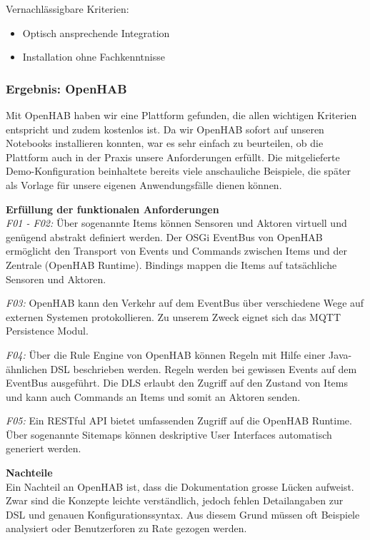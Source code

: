 Vernachlässigbare Kriterien:
\begin{itemize}
	\item Optisch ansprechende Integration
	\item Installation ohne Fachkenntnisse
\end{itemize}

\subsubsection{Ergebnis: OpenHAB} 
Mit OpenHAB haben wir eine Plattform gefunden, die allen wichtigen Kriterien entspricht und zudem kostenlos ist. Da wir OpenHAB sofort auf unseren Notebooks installieren konnten, war es sehr einfach zu beurteilen, ob die Plattform auch in der Praxis unsere Anforderungen erfüllt. Die mitgelieferte Demo-Konfiguration beinhaltete bereits viele anschauliche Beispiele, die später als Vorlage für unsere eigenen Anwendungsfälle dienen können. 

\textbf{Erfüllung der funktionalen Anforderungen} \\
\textit{F01 - F02:} Über sogenannte Items können Sensoren und Aktoren virtuell und genügend abstrakt definiert werden. Der OSGi EventBus von OpenHAB ermöglicht den Transport von Events und Commands zwischen Items und der Zentrale (OpenHAB Runtime). Bindings mappen die Items auf tatsächliche Sensoren und Aktoren.

\textit{F03:} OpenHAB kann den Verkehr auf dem EventBus über verschiedene Wege auf externen Systemen protokollieren. Zu unserem Zweck eignet sich das MQTT Persistence Modul.

\textit{F04:} Über die Rule Engine von OpenHAB können Regeln mit Hilfe einer Java-ähnlichen DSL beschrieben werden. Regeln werden bei gewissen Events auf dem EventBus ausgeführt. Die DLS erlaubt den Zugriff auf den Zustand von Items und kann auch Commands an Items und somit an Aktoren senden.

\textit{F05:} Ein RESTful API bietet umfassenden Zugriff auf die OpenHAB Runtime. Über sogenannte Sitemaps können deskriptive User Interfaces automatisch generiert werden.






\textbf{Nachteile} \\
Ein Nachteil an OpenHAB ist, dass die Dokumentation grosse Lücken aufweist. Zwar sind die Konzepte leichte verständlich, jedoch fehlen Detailangaben zur DSL und genauen Konfigurationssyntax. Aus diesem Grund müssen oft Beispiele analysiert oder Benutzerforen zu Rate gezogen werden.

